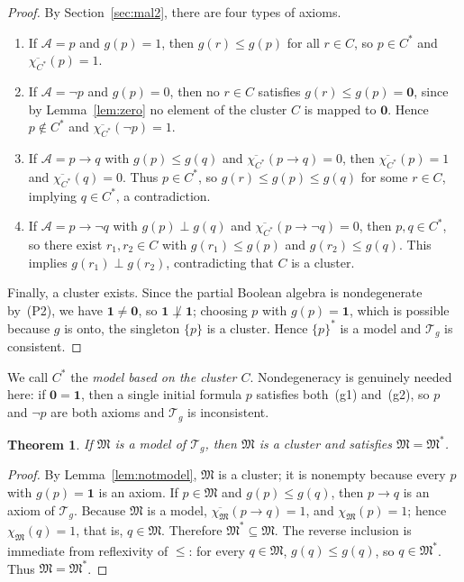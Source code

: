 \documentclass{article}   	%
\theoremstyle{plain}
\newtheorem{theorem}{Theorem}[section]
\theoremstyle{definition}
\theoremstyle{remark}
\begin{document}
\begin{proof}
By Section~\ref{sec:mal2}, there are four types of axioms.

\begin{enumerate}
\item If $\mathcal A=p$ and $g(p)=1$, then $g(r)\le g(p)$ for all $r\in C$,
so $p\in C^*$ and $\overline{\chi_{C^*}}(p)=1$.

\item If $\mathcal A=\neg p$ and $g(p)=0$, then no $r\in C$ satisfies
$g(r)\le g(p)=\mathbf 0$, since by Lemma~\ref{lem:zero} no element of the cluster
$C$ is mapped to $\mathbf 0$.
Hence $p\notin C^*$ and $\overline{\chi_{C^*}}(\neg p)=1$.

\item If $\mathcal A=p\to q$ with $g(p)\le g(q)$ and
$\overline{\chi_{C^*}}(p\to q)=0$, then
$\overline{\chi_{C^*}}(p)=1$ and $\overline{\chi_{C^*}}(q)=0$.
Thus $p\in C^*$, so $g(r)\le g(p)\le g(q)$ for some $r\in C$,
implying $q\in C^*$, a contradiction.

\item If $\mathcal A=p\to\neg q$ with $g(p)\perp g(q)$ and
$\overline{\chi_{C^*}}(p\to\neg q)=0$, then
$p,q\in C^*$, so there exist $r_1,r_2\in C$ with
$g(r_1)\le g(p)$ and $g(r_2)\le g(q)$.
This implies $g(r_1)\perp g(r_2)$, contradicting that $C$ is a cluster.
\end{enumerate}

Finally, a cluster exists.  Since the partial Boolean algebra is nondegenerate
by~\rm(P2), we have $\mathbf 1\ne\mathbf 0$, so $\mathbf 1\not\perp\mathbf 1$;
choosing $p$ with $g(p)=\mathbf 1$, which is possible because $g$ is onto, the
singleton $\{p\}$ is a cluster.  Hence $\{p\}^*$ is a model and
$\mathcal T_g$ is consistent.
\end{proof}
We call $C^*$ the \emph{model based on the cluster $C$}.
Nondegeneracy is genuinely needed here: if $\mathbf 0=\mathbf 1$, then a single
initial formula $p$ satisfies both~(g1) and~(g2), so $p$ and $\neg p$ are both
axioms and $\mathcal T_g$ is inconsistent.

\begin{theorem}
\label{thm:models-are-clusters}
If $\mathfrak M$ is a model of $\mathcal T_g$, then $\mathfrak M$ is a cluster
and satisfies $\mathfrak M=\mathfrak M^*$.
\end{theorem}

\begin{proof}
By Lemma~\ref{lem:notmodel}, $\mathfrak M$ is a cluster; it is nonempty because
every $p$ with $g(p)=\mathbf 1$ is an axiom.
If $p\in\mathfrak M$ and $g(p)\le g(q)$, then $p\to q$ is an axiom of
$\mathcal T_g$.  Because $\mathfrak M$ is a model,
$\overline{\chi_{\mathfrak M}}(p\to q)=1$, and
$\chi_{\mathfrak M}(p)=1$; hence
$\chi_{\mathfrak M}(q)=1$, that is, $q\in\mathfrak M$.
Therefore $\mathfrak M^*\subseteq\mathfrak M$.  The reverse inclusion is
immediate from reflexivity of $\le$: for every $q\in\mathfrak M$,
$g(q)\le g(q)$, so $q\in\mathfrak M^*$.  Thus
$\mathfrak M=\mathfrak M^*$.
\end{proof}
\end{document}
